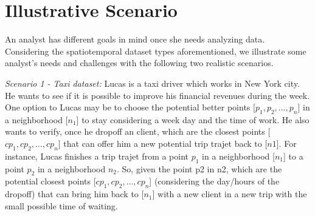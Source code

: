\section{Illustrative Scenario}\label{sec:scenarios}

An analyst has different goals in mind once she needs analyzing data.
Considering the spatiotemporal dataset types aforementioned, we illustrate some
analyst's needs and challenges with the following two realistic scenarios.   
\bigskip

\textit{Scenario 1 - Taxi dataset:} Lucas is a taxi driver which works in New
York city. He wants to see if it is possible to improve his financial revenues
during the week. One option to Lucas may be to choose the potential better
points [$p_1, p_2, \ldots, p_n $] in a neighborhood [$n_1$] to stay considering
a week day and the time of work. He also wants to verify, once he dropoff an
client, which are the closest points [$cp_1, cp_2, \ldots, cp_n $] that can
offer him a new potential trip trajet back to [$n1$]. For instance, Lucas
finishes a trip trajet from a point $p_1$ in a neighborhood [$n_1$] to a point
$p_2$ in a neighborhood $n_2$.  So, given the point p2 in n2, which are the
potential closest points [$cp_1, cp_2, \ldots, cp_n $] (considering the
day/hours of the dropoff) that can bring him back to [$n_1$] with a new client
in a new trip with the small possible time of waiting.
\bigskip

% 
% 
